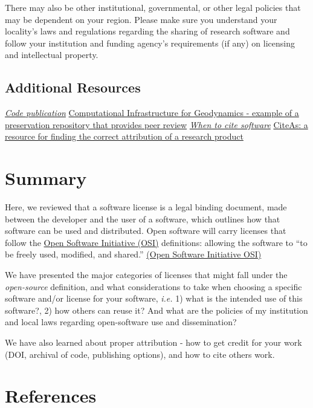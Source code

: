 \documentclass[
  letterpaper,
  DIV=11,
  numbers=noendperiod]{scrreport}
\begin{document}
There may also be other institutional, governmental, or other legal
policies that may be dependent on your region. Please make sure you
understand your locality's laws and regulations regarding the sharing of
research software and follow your institution and funding agency's
requirements (if any) on licensing and intellectual property.

\hypertarget{additional-resources-1}{%
\subsection{Additional Resources}\label{additional-resources-1}}

\emph{\href{https://scicodes.net}{Code publication}
}\href{https://geodynamics.org}{Computational Infrastructure for
Geodynamics - example of a preservation repository that provides peer
review} \emph{\href{https://f1000research.com/articles/9-1257/v2}{When
to cite software} }\href{http://citeas.org}{CiteAs: a resource for
finding the correct attribution of a research product}

\hypertarget{summary-5}{%
\section{Summary}\label{summary-5}}

Here, we reviewed that a software license is a legal binding document,
made between the developer and the user of a software, which outlines
how that software can be used and distributed. Open software will carry
licenses that follow the \href{https://opensource.org/licenses}{Open
Software Initiative (OSI)} definitions: allowing the software to ``to be
freely used, modified, and shared.''
\href{https://opensource.org/licenses}{(Open Software Initiative OSI)}

We have presented the major categories of licenses that might fall under
the \emph{open-source} definition, and what considerations to take when
choosing a specific software and/or license for your software,
\emph{i.e.} 1) what is the intended use of this software?, 2) how others
can reuse it? And what are the policies of my institution and local laws
regarding open-software use and dissemination?

We have also learned about proper attribution - how to get credit for
your work (DOI, archival of code, publishing options), and how to cite
others work.

\hypertarget{references}{%
\section{References}\label{references}}
\end{document}
